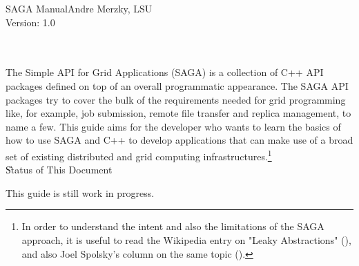 
\newcommand{\sagadocument}{SAGA  Manual}
\newcommand{\sagaversion}{1.0}
\newcommand{\sagabasename}{saga-programming-guide}
\newcommand{\sagaemail}{saga-users@cct.lsu.edu}



\newcommand{\name}{\F{SAGA}\xspace}
\DefineShortVerb{\|}



 \thispagestyle{empty}

 \sagadocument\hfill  Andre Merzky, LSU\\
  Version: \sagaversion \hfill {\sagadate}


  \hrulefill\\[2em]

  \\[4em]




   The Simple API for Grid Applications (SAGA) is a collection of C++
   API packages defined on top of an overall programmatic appearance.
   The SAGA API packages try to cover the bulk of the requirements
   needed for grid programming like, for example, job submission,
   remote file transfer and replica management, to name a few.  This
   guide aims for the developer who wants to learn the basics of how
   to use SAGA and C++ to develop applications that can make use of a
   broad set of existing distributed and grid computing
   infrastructures.\footnote{In order to understand the intent and also
   the limitations of the SAGA approach, it is useful to read the
   Wikipedia entry on "Leaky Abstractions"
   (), and also
   Joel Spolsky's column on the same topic
   ().}\\[2em]


  \U{Status of This Document}

  This guide is still work in progress.\\

  \newpage

  \tableofcontents

  \newpage

                                        
